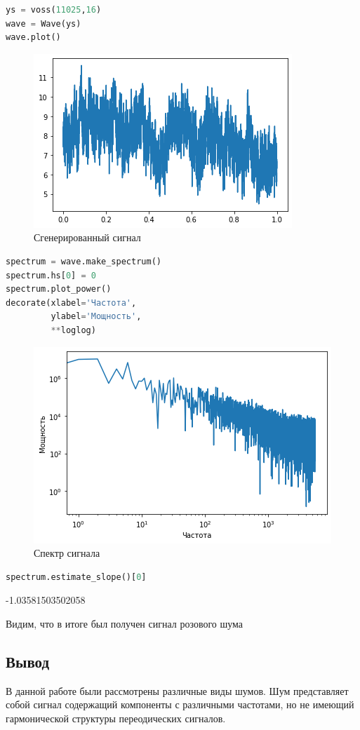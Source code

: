 \begin{lstlisting}[language=Python]
ys = voss(11025,16)
wave = Wave(ys)
wave.plot()
\end{lstlisting}

\begin{figure}[H]
	\begin{center}
		\includegraphics[scale=1]{fig/lab04/lab04_7.png}
		\caption{Сгенерированный сигнал}
	\end{center}
\end{figure}

\begin{lstlisting}[language=Python]
spectrum = wave.make_spectrum()
spectrum.hs[0] = 0
spectrum.plot_power()
decorate(xlabel='Частота',
         ylabel='Мощность',
         **loglog)
\end{lstlisting}
\begin{figure}[H]
	\begin{center}
		\includegraphics[scale=1]{fig/lab04/lab04_8.png}
		\caption{Спектр сигнала}
	\end{center}
\end{figure}

\begin{lstlisting}[language=Python]
spectrum.estimate_slope()[0]
\end{lstlisting}

-1.03581503502058

\noindent Видим, что в итоге был получен сигнал розового шума

\subsection{Вывод}

В данной работе были рассмотрены различные виды шумов. Шум представляет собой сигнал содержащий компоненты с различными частотами, но не имеющий гармонической структуры переодических сигналов.
